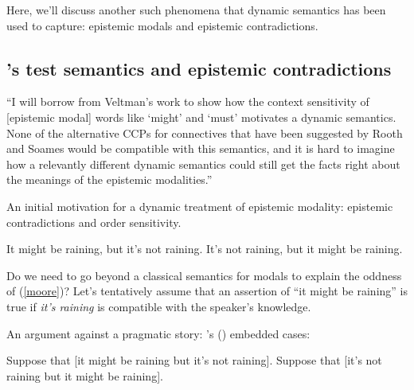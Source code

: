 \documentclass[nols,twoside,nofonts,nobib,nohyper]{tufte-handout}
\theoremstyle{definition}
\begin{document}
Here, we'll discuss another such phenomena that dynamic semantics has been used to capture: epistemic modals and epistemic contradictions.

\subsection{\citeauthor{Veltman1996}'s test semantics and epistemic contradictions}


\begin{displayquote}
  \enquote{I will borrow from Veltman’s work to show how the context sensitivity of [epistemic modal] words like `might' and `must' motivates a dynamic semantics. None of the alternative CCPs for connectives
that have been suggested by Rooth and Soames would be compatible with this semantics, and it is hard to imagine how a relevantly different dynamic semantics could still get the facts right about the meanings of the epistemic modalities.}
\end{displayquote}

An initial motivation for a dynamic treatment of epistemic modality: epistemic contradictions and order sensitivity.

\pex\label{moore}
\a{}It might be raining, but it's not raining.\label{moore1}
\a\ljudge{\#}It's not raining, but it might be raining.\label{moore2}
\xe

Do we need to go beyond a classical semantics for modals to explain the oddness of (\ref{moore})? Let's tentatively assume that an assertion of \enquote{it might be raining} is true if \textit{it's raining} is compatible with the speaker's knowledge.

An argument against a pragmatic story: \citeauthor{Yalcin2007}'s (\citeyear{Yalcin2007}) embedded cases:

\pex
\a{}Suppose that [it might be raining but it's not raining].
\a{}Suppose that [it's not raining but it might be raining].
\xe
\end{document}
